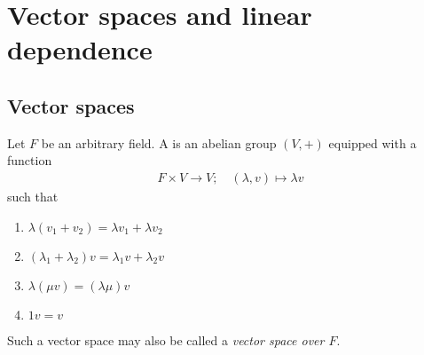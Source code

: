 % 

\def\npart {IB}
\def\nterm {Michaelmas}
\def\nyear {2022}
\def\nlecturer {Prof. P. Raphael}
\def\ncourse {Linear Algebra}


\newcommand{\genset}[1]{\langle{} #1 \rangle}
\DeclareMathOperator{\vecspan}{span}
\newcommand{\transpose}{\intercal}
\DeclareMathOperator{\nullity}{null}
\newcommand{\inv}{^{-1}}

\usepackage{bbm}
% 

\author{Based on lectures by \nlecturer \ and notes by thirdsgames.co.uk}



    \maketitle
    \tableofcontents

    \section{Vector spaces and linear dependence}
    \subsection{Vector spaces}
    \begin{definition}
        Let $F$ be an arbitrary field.
        A  is an abelian group $(V, +)$ equipped with a function
        \begin{align*}
            F \times V \to V;\quad (\lambda, v) \mapsto \lambda v
        \end{align*}
        such that
        \begin{enumerate}
            \item $\lambda(v_1 + v_2) = \lambda v_1 + \lambda v_2$
            \item $(\lambda_1 + \lambda_2) v = \lambda_1 v + \lambda_2 v$
            \item $\lambda ( \mu v ) = ( \lambda \mu ) v$
            \item $1 v = v$
        \end{enumerate}
        Such a vector space may also be called a \textit{vector space over $F$}.
    \end{definition}


